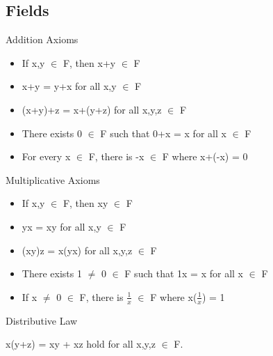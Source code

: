 \subsection{Fields}

Addition Axioms
	\begin{itemize}[leftmargin=1cm, itemsep=0.1cm]
		\item If x,y $\in$ F, then x+y $\in$ F
	
		\item x+y = y+x for all x,y $\in$ F
	
		\item (x+y)+z = x+(y+z) for all x,y,z $\in$ F
	
		\item There exists 0 $\in$ F such that 0+x = x for all x $\in$ F
	
		\item For every x $\in$ F, there is -x $\in$ F where x+(-x) = 0
	\end{itemize}

Multiplicative Axioms
	\begin{itemize}[leftmargin=1cm, itemsep=0.1cm]
		\item If x,y $\in$ F, then xy $\in$ F
	
		\item yx = xy for all x,y $\in$ F
	
		\item (xy)z = x(yx) for all x,y,z $\in$ F
	
		\item There exists 1 $\not =$ 0 $\in$ F such that 1x = x for all x $\in$ F
	
		\item If x $\not =$ 0 $\in$ F, there is $\frac{1}{x}$ $\in$ F
		where x($\frac{1}{x}$) = 1
	\end{itemize}

Distributive Law

	\qquad x(y+z) = xy + xz hold for all x,y,z $\in$ F. \\

